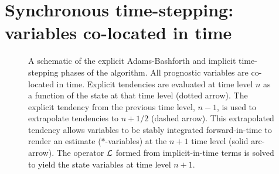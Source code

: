 \section{Synchronous time-stepping: variables co-located in time}
\label{sect:adams-bashforth-sync}

\begin{figure}
\begin{center}
\end{center}
\caption{
A schematic of the explicit Adams-Bashforth and implicit time-stepping
phases of the algorithm. All prognostic variables are co-located in
time. Explicit tendencies are evaluated at time level $n$ as a
function of the state at that time level (dotted arrow). The explicit
tendency from the previous time level, $n-1$, is used to extrapolate
tendencies to $n+1/2$ (dashed arrow). This extrapolated tendency
allows variables to be stably integrated forward-in-time to render an
estimate ($*$-variables) at the $n+1$ time level (solid
arc-arrow). The operator ${\cal L}$ formed from implicit-in-time terms
is solved to yield the state variables at time level $n+1$. }
\label{fig:adams-bashforth-sync}
\end{figure}

